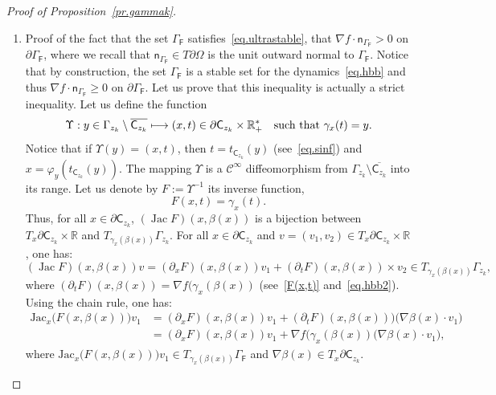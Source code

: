\documentclass[JEP,XML,SOM,Unicode,NoEqCountersInSection,NoFloatCountersInSection,published]{cedram}
\newcommand\mto{\mathchoice{\longmapsto}{\mapsto}{\mapsto}{\mapsto}}
\DeclareMathOperator{\Jac}{Jac}
\let\pa\partial
\theoremstyle{plain}
\theoremstyle{definition}
\begin{document}
\begin{proof}[Proof of Proposition~\ref{pr.gammak}]
\begin{enumerate}
\item
Proof of the fact that the set $\Gamma_{\mathsf F}$ satisfies~\eqref{eq.ultrastable}, \ie that
$\nabla f\cdot \mathsf n_{ \Gamma_{\mathsf F} }>0$ on $ \pa \Gamma_{\mathsf F}$,
where we recall that $\mathsf n_{ \Gamma_{\mathsf F}}\in T\partial \Omega$ is the unit outward normal to $ \Gamma_{\mathsf F}$. Notice that by construction, the set $ \Gamma_{\mathsf F}$ is a stable set for the dynamics~\eqref{eq.hbb} and thus $\nabla f\cdot \mathsf n_{ \Gamma_{\mathsf F} }\ge0$ on $ \pa \Gamma_{\mathsf F}$. Let us prove that this inequality is actually a strict inequality. Let us define the function
\[
\Upsilon: y\in \Gamma_{z_k}\setminus \overline{\mathsf C_{z_k}}\mto (x,t)\in \pa \mathsf C_{z_k}\times \mathbb R_+^* \quad\text{such that } \gamma_x(t)=y.
\]
Notice that if $\Upsilon(y)=(x,t)$, then $t=t_{\mathsf C_{z_k}}(y)$
(see~\eqref{eq.sinf}) and $x=\varphi_{y}(t_{\mathsf C_{z_k}}(y))$. The mapping $\Upsilon$ is a $\mathcal C^\infty$ diffeomorphism from $\Gamma_{z_k}\setminus \overline{\mathsf C_{z_k}}$ into its range. Let us denote by $F:=\Upsilon^{-1}$ its inverse function, \ie
\begin{equation}\label{F(x,t)}
F(x,t)=\gamma_x(t).
\end{equation}
Thus, for all $x\in \pa \mathsf C_{z_k}$, $ (\Jac F) (x,\beta(x))$ is a bijection between $T_x\pa \mathsf C_{z_k} \times \mathbb R$ and $ T_{\gamma_x(\beta(x))} \Gamma_{z_k}$. For all $x\in \pa \mathsf C_{z_k}$ and $v = (v_1,v_2)\in T_x\pa \mathsf C_{z_k} \times \mathbb R$, one has:
\begin{equation}\label{jac1}
(\Jac F) (x,\beta(x))v= (\partial_x F)(x,\beta(x)) v_1+ (\partial_t F) (x,\beta(x)) \times v_2 \in T_{\gamma_x(\beta(x))} \Gamma_{z_k},
\end{equation}
where $ (\partial_t F)(x,\beta(x)) = \nabla f(\gamma_x(\beta(x)) $ (see~\eqref{F(x,t)} and~\eqref{eq.hbb2}). Using the chain rule, one has:
\begin{equation}
\label{jac2}
\begin{aligned}
\text{Jac}_x \bigl(F(x,\beta(x))\bigr) v_1&= (\partial_xF)(x,\beta(x)) v_1 + (\partial_t F)(x,\beta(x))) \bigl(\nabla\beta(x) \cdot v_1\bigr)\\
&= (\pa _xF)(x,\beta(x)) v_1 + \nabla f(\gamma_x(\beta(x)) \bigl(\nabla\beta(x) \cdot v_1\bigr),
\end{aligned}
\end{equation}
where $\text{Jac}_x \bigl(F(x,\beta(x))\bigr) v_1\in T_{\gamma_x(\beta(x))} \Gamma_{\mathsf F} $ and $\nabla\beta(x)\in T_x\pa \mathsf C_{z_k}$.

\end{enumerate}
\end{proof}
\end{document}
